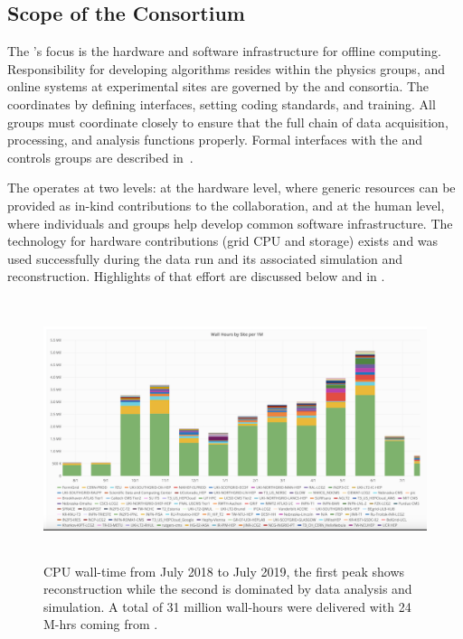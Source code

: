 \subsection{Scope of the Consortium}
The 's focus is the hardware and software infrastructure  for offline computing.  Responsibility for developing algorithms  resides within the physics groups, %
and online systems at experimental sites are governed by the  and  consortia. The  coordinates by defining interfaces, setting coding standards, and training. All groups must coordinate closely to ensure that the full chain of data acquisition, processing, and analysis %
functions properly. Formal interfaces with the  and controls groups are described in~\cite{bib:docdb7123,bib:docdb7126}. %

The  operates at two levels: at the hardware level, where generic resources can be provided as in-kind contributions to the collaboration, and at the human level, where individuals and groups help develop common software infrastructure.  The   technology for hardware contributions (grid CPU and storage) exists and was used successfully during the  data run and its associated %
simulation and reconstruction. Highlights of that effort are discussed below and in \physchtools{}. %



\begin{figure}[htp]
\centering
\includegraphics[height=3in]{graphics/comp-ComputingLastYear.png}
\caption[CPU wall-time from July 2018 to July 2019]{CPU wall-time from July 2018 to July 2019, the first peak shows   reconstruction while the second is dominated by data analysis and  simulation. A total of 31 million wall-hours were delivered with 24 M-hrs coming from \fnal.  }
\label{fig:ch-exec-comp-cpupie-es}
\end{figure}


